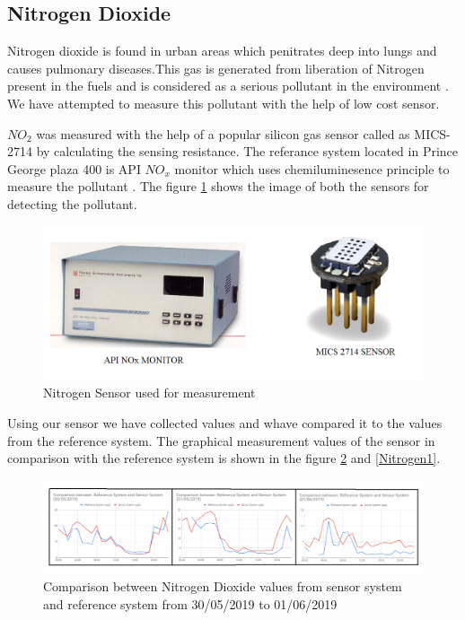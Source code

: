    \subsection{Nitrogen Dioxide}

 Nitrogen dioxide is found in urban areas which penitrates deep into lungs and causes pulmonary diseases.This gas is generated from liberation of Nitrogen present in the fuels and is considered as a serious pollutant in the environment \cite{Salonen2019} \cite{govcanada}. We have attempted to measure this pollutant with the help of low cost sensor. 
 
 $NO_{2}$ was measured with the help of a popular silicon gas sensor called as MICS-2714 by calculating the sensing resistance. The referance system located in Prince George plaza 400 is API $NO_{x}$ monitor \cite{Environment2010} which uses chemiluminesence principle to measure the pollutant . The figure \ref{Nitrogensensor} shows the image of both the sensors for detecting the pollutant.
   
   
   \begin{figure}[h]
    \begin{center}
    \includegraphics[scale=0.70]{images/figure31.png}
    \end{center}
    \caption{Nitrogen Sensor used for measurement}
  \label{Nitrogensensor}
\end{figure}
   
   
   
Using our sensor we have collected values and whave compared it to the values from the reference system. The graphical measurement values of the sensor in comparison with the reference system is shown in  the figure \ref{Nitrogen} and \ref{Nitrogen1}. 


   \begin{figure}[h]
      \begin{center}
      \includegraphics[scale=0.70]{images/figure23.png}
      \end{center}
      \caption{Comparison between Nitrogen Dioxide values from sensor system and reference system from 30/05/2019 to 01/06/2019}
    \label{Nitrogen}
  \end{figure}


